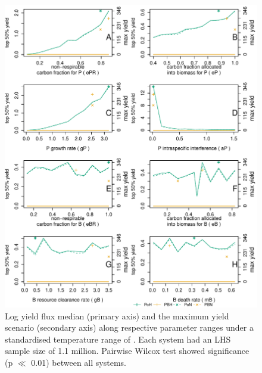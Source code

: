 \documentclass[../thesis.tex]{subfiles} %
\begin{document}
\begin{figure}[H]
    \centering
    \includegraphics[width=\linewidth]{result/yieldFlux.pdf}
    \caption[Yield flux median in biological parameter space]{Log yield flux median (primary axis) and the maximum yield scenario (secondary axis) along respective parameter ranges under a standardised temperature range of \temp.  Each system had an LHS sample size of 1.1 million.  Pairwise Wilcox test showed significance (p $\ll$ 0.01) between all systems.}
    \label{f:ydByPara}
\end{figure}
\end{document}
